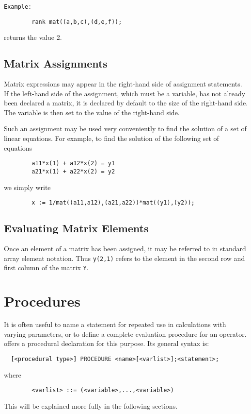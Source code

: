 {\tt Example:}

\begin{verbatim}
        rank mat((a,b,c),(d,e,f));
\end{verbatim}
returns the value 2.

\section{Matrix Assignments} 

Matrix expressions may appear in the right-hand side of assignment
statements. If the left-hand side of the assignment, which must be a
variable, has not already been declared a matrix, it is declared by default
to the size of the right-hand side. The variable is then set to the value
of the right-hand side.

Such an assignment may be used very conveniently to find the solution of a
set of linear equations. For example, to find the solution of the
following set of equations
\begin{verbatim}
        a11*x(1) + a12*x(2) = y1
        a21*x(1) + a22*x(2) = y2
\end{verbatim}
we simply write
\begin{verbatim}
        x := 1/mat((a11,a12),(a21,a22))*mat((y1),(y2));
\end{verbatim}

\section{Evaluating Matrix Elements}

Once an element of a matrix has been assigned, it may be referred to in
standard array element notation.  Thus {\tt y(2,1)} refers to the element
in the second row and first column of the matrix {\tt Y}.

\chapter{Procedures} 

It is often useful to name a statement for repeated use in calculations
with varying parameters, or to define a complete evaluation procedure for
an operator. {\REDUCE} offers a procedural declaration for this purpose. Its
general syntax is:
\begin{verbatim}
  [<procedural type>] PROCEDURE <name>[<varlist>];<statement>;
\end{verbatim}
where
\begin{verbatim}
        <varlist> ::= (<variable>,...,<variable>)
\end{verbatim}
This will be explained more fully in the following sections.

